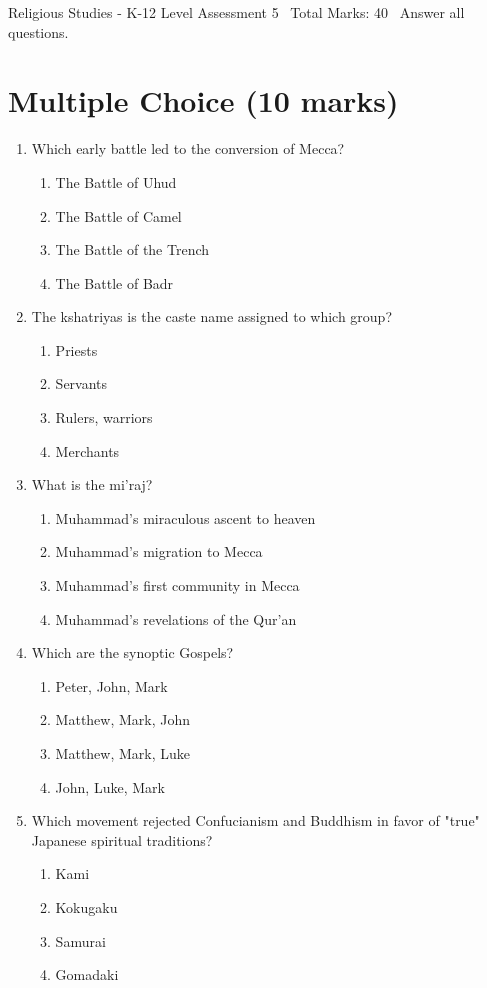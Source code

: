 \documentclass[12pt]{article}
\begin{document}
\begin{center}
Religious Studies - K-12 Level Assessment 5 \
Total Marks: 40 \
Answer all questions.
\end{center}

\section*{Multiple Choice (10 marks)}
\begin{enumerate}[label=\arabic*.]
\item Which early battle led to the conversion of Mecca?
\begin{enumerate}[label=(\alph*)]
    \item The Battle of Uhud
    \item The Battle of Camel
    \item The Battle of the Trench
    \item The Battle of Badr
\end{enumerate}
\item The kshatriyas is the caste name assigned to which group?
\begin{enumerate}[label=(\alph*)]
    \item Priests
    \item Servants
    \item Rulers, warriors
    \item Merchants
\end{enumerate}
\item What is the mi'raj?
\begin{enumerate}[label=(\alph*)]
    \item Muhammad's miraculous ascent to heaven
    \item Muhammad's migration to Mecca
    \item Muhammad's first community in Mecca
    \item Muhammad's revelations of the Qur'an
\end{enumerate}
\item Which are the synoptic Gospels?
\begin{enumerate}[label=(\alph*)]
    \item Peter, John, Mark
    \item Matthew, Mark, John
    \item Matthew, Mark, Luke
    \item John, Luke, Mark
\end{enumerate}
\item Which movement rejected Confucianism and Buddhism in favor of "true" Japanese spiritual traditions?
\begin{enumerate}[label=(\alph*)]
    \item Kami
    \item Kokugaku
    \item Samurai
    \item Gomadaki
\end{enumerate}
\end{enumerate}
\end{document}

